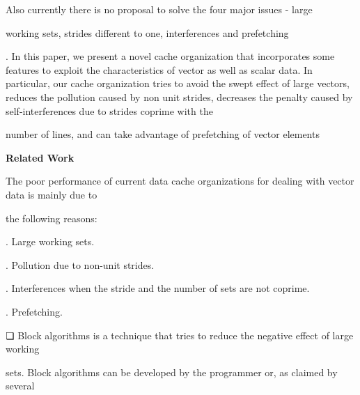 \documentclass[12pt]{article}
\begin{document}
\setlength{\parskip}{0.0pt}
Also currently there is no proposal to solve the four major issues - large\par

working sets, strides different to one, interferences and prefetching{\fontsize{9pt}{10.8pt}\selectfont  \par}. In this paper, we present a novel cache organization that incorporates some features to exploit the characteristics of vector as well as scalar data. In particular, our cache organization tries to avoid the swept effect of large vectors, reduces the pollution caused by non unit strides, decreases the penalty caused by self-interferences due to strides coprime with the\par

number of lines, and can take advantage of prefetching of vector elements\par

{\fontsize{14pt}{16.8pt}\selectfont \textbf{Related Work}\par}\par

{\fontsize{10pt}{12.0pt}\selectfont The poor performance of current data cache organizations for dealing with vector data is mainly due to\par}\par

{\fontsize{10pt}{12.0pt}\selectfont the following reasons:\par}\par

{\fontsize{10pt}{12.0pt}. Large working sets.\par}\par

{\fontsize{10pt}{12.0pt}. Pollution due to non-unit strides.\par}\par

{\fontsize{10pt}{12.0pt}. Interferences when the stride and the number of sets are not coprime.\par}\par

{\fontsize{10pt}{12.0pt}. Prefetching.\par}\par

❏ Block algorithms is a technique that tries to reduce the negative effect of large working\par

sets. Block algorithms can be developed by the programmer or, as claimed by several\par
\end{document}
